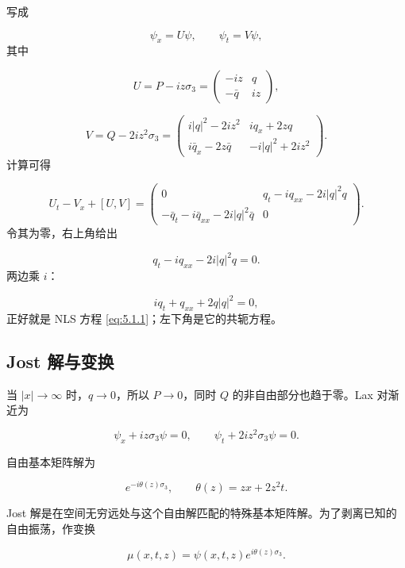 \documentclass[
    lang=cn,
    scheme=chinese,
    mode=simple,
    device=normal,
    color=blue,
    math=cm,
    thmcnt=section,
    12pt,
    nowatermark
]{elegantbook}
\begin{document}
\begin{callout}
    写成

    \[
        \psi_x=U\psi,\qquad
        \psi_t=V\psi,
    \]
    其中

    \[
        U=
        P-iz\sigma_3
        =
        \begin{pmatrix}
            -iz     & q  \\
            -\bar q & iz
        \end{pmatrix},
    \]

    \[
        V=
        Q-2iz^2\sigma_3
        =
        \begin{pmatrix}
            i|q|^2-2iz^2       & iq_x+2zq      \\
            i\bar q_x-2z\bar q & -i|q|^2+2iz^2
        \end{pmatrix}.
    \]
    计算可得

    \[
        U_t-V_x+[U,V]
        =
        \begin{pmatrix}
            0                                    &
            q_t-iq_{xx}-2i|q|^2q                   \\
            -\bar q_t-i\bar q_{xx}-2i|q|^2\bar q &
            0
        \end{pmatrix}.
    \]
    令其为零，右上角给出

    \[
        q_t-iq_{xx}-2i|q|^2q=0.
    \]
    两边乘 $i$：

    \[
        iq_t+q_{xx}+2q|q|^2=0,
    \]
    正好就是 NLS 方程 \eqref{eq:5.1.1}；左下角是它的共轭方程。
\end{callout}

\subsection{Jost 解与变换}

当 $\lvert x\rvert\to\infty$ 时，$q\to0$，所以 $P\to0$，同时 $Q$ 的非自由部分也趋于零。Lax 对渐近为

\[
    \psi_x+iz\sigma_3\psi=0,\qquad
    \psi_t+2iz^2\sigma_3\psi=0.
\]

自由基本矩阵解为

\[
    e^{-i\theta(z)\sigma_3},
    \qquad
    \theta(z)=zx+2z^2t.
\]

Jost 解是在空间无穷远处与这个自由解匹配的特殊基本矩阵解。为了剥离已知的自由振荡，作变换

\begin{equation}
    \mu(x,t,z)=\psi(x,t,z)e^{i\theta(z)\sigma_3}.
    \tag{5.1.5}
    \label{eq:5.1.5}
\end{equation}
\end{document}
